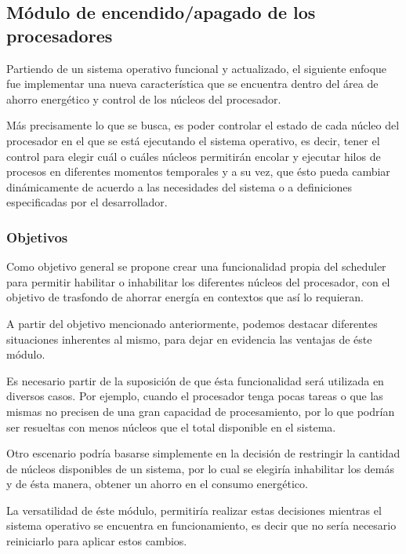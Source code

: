 \subsection{Módulo de encendido/apagado de los procesadores}
Partiendo de un sistema operativo funcional y actualizado, el siguiente enfoque fue implementar una nueva característica que se encuentra dentro del área de ahorro energético y control de los núcleos del procesador.\par

Más precisamente lo que se busca, es poder controlar el estado de cada núcleo del procesador en el que se está ejecutando el sistema operativo, es decir, tener el control para elegir cuál o cuáles núcleos permitirán encolar y ejecutar hilos de procesos en diferentes momentos temporales y a su vez, que ésto pueda cambiar dinámicamente de acuerdo a las necesidades del sistema o a definiciones especificadas por el desarrollador.\par


\subsubsection{Objetivos}

Como objetivo general se propone crear una funcionalidad propia del scheduler para permitir habilitar o inhabilitar los diferentes núcleos del procesador, con el objetivo de trasfondo de ahorrar energía en contextos que así lo requieran.\par

A partir del objetivo mencionado anteriormente, podemos destacar diferentes situaciones inherentes al mismo, para dejar en evidencia las ventajas de éste módulo.\par

Es necesario partir de la suposición de que ésta funcionalidad será utilizada en diversos casos. Por ejemplo, cuando el procesador tenga pocas tareas o que las mismas no precisen de una gran capacidad de procesamiento, por lo que podrían ser resueltas con menos núcleos que el total disponible en el sistema.\par

Otro escenario podría basarse simplemente en la decisión de restringir la cantidad de núcleos disponibles de un sistema, por lo cual se elegiría inhabilitar los demás y de ésta manera, obtener un ahorro en el consumo energético.\par

La versatilidad de éste módulo, permitiría realizar estas decisiones mientras el sistema operativo se encuentra en funcionamiento, es decir que no sería necesario reiniciarlo para aplicar estos cambios.\par


